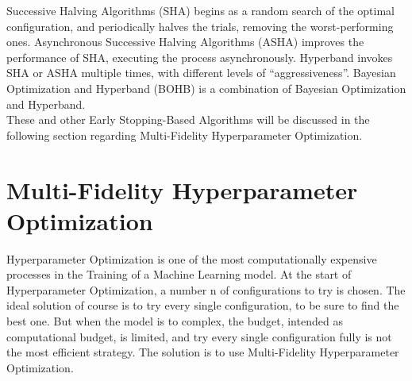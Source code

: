 \newline Successive Halving Algorithms (SHA) begins as a random search of the optimal configuration, and periodically halves the trials, removing the worst-performing ones.
\newline Asynchronous Successive Halving Algorithms (ASHA) improves the performance of SHA, executing the process asynchronously.
\newline Hyperband invokes SHA or ASHA multiple times, with different levels of “aggressiveness”.
\newline Bayesian Optimization and Hyperband (BOHB) is a combination of Bayesian Optimization and Hyperband.
\\[0.3cm]These and other Early Stopping-Based Algorithms will be discussed in the following section regarding Multi-Fidelity Hyperparameter Optimization.

\section{Multi-Fidelity Hyperparameter Optimization}

Hyperparameter Optimization is one of the most computationally expensive processes in the Training of a Machine Learning model.
At the start of Hyperparameter Optimization, a number n of configurations to try is chosen. The ideal solution of course is to try every single configuration, to be sure to find the best one.
But when the model is to complex, the budget, intended as computational budget, is limited, and try every single configuration fully is not the most efficient strategy.
The solution is to use Multi-Fidelity Hyperparameter Optimization.

